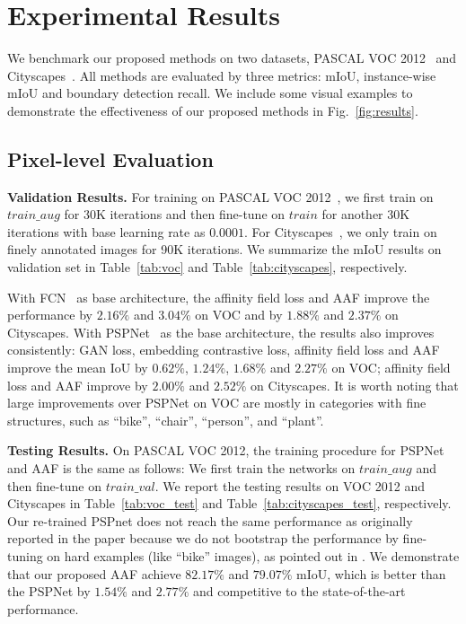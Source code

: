 \section{Experimental Results}
\label{sec:exp_results}
We benchmark our proposed methods on two datasets, PASCAL VOC 2012~\cite{everingham2010pascal} and Cityscapes~\cite{Cordts2016Cityscapes}. All methods are evaluated by three metrics: mIoU, instance-wise mIoU and boundary detection recall. We include some visual examples to demonstrate the effectiveness of our proposed methods in Fig.~\ref{fig:results}.

\subsection{Pixel-level Evaluation}
\label{sec:pix_eval}

\noindent
\textbf{Validation Results.}
For training on PASCAL VOC 2012~\cite{everingham2010pascal}, we first train on $train\_aug$ for 30K iterations and then fine-tune on $train$ for another 30K iterations with base learning rate as $0.0001$. For Cityscapes~\cite{Cordts2016Cityscapes}, we only train on finely annotated images for 90K iterations. We summarize the mIoU results on validation set in Table~\ref{tab:voc} and Table~\ref{tab:cityscapes}, respectively.

With FCN~\cite{long2015fully} as base architecture, the affinity field loss and AAF improve the performance by $2.16\%$ and $3.04\%$ on VOC and by $1.88\%$ and $2.37\%$ on Cityscapes. With PSPNet~\cite{zhao2016pyramid} as the base architecture, the results also improves consistently: GAN loss, embedding contrastive loss, affinity field loss and AAF improve the mean IoU by $0.62\%$, $1.24\%$, $1.68\%$ and $2.27\%$ on VOC; affinity field loss and AAF improve by $2.00\%$ and $2.52\%$ on Cityscapes. It is worth noting that large improvements over PSPNet on VOC are mostly in categories with fine structures, such as ``bike'', ``chair'', ``person'', and ``plant''. 


\noindent
\textbf{Testing Results.}
On PASCAL VOC 2012, the training procedure for PSPNet and AAF is the same as follows: We first train the networks on $train\_aug$ and then fine-tune on $train\_val$. We report the testing results on VOC 2012 and Cityscapes in Table~\ref{tab:voc_test} and Table~\ref{tab:cityscapes_test}, respectively. Our re-trained PSPnet does not reach the same performance as originally reported in the paper because we do not bootstrap the performance by fine-tuning on hard examples (like ``bike'' images), as pointed out in \cite{chen2017rethinking}. We demonstrate that our proposed AAF achieve $82.17\%$ and $79.07\%$ mIoU, which is better than the PSPNet by $1.54\%$ and $2.77\%$ and competitive to the state-of-the-art performance.\\

